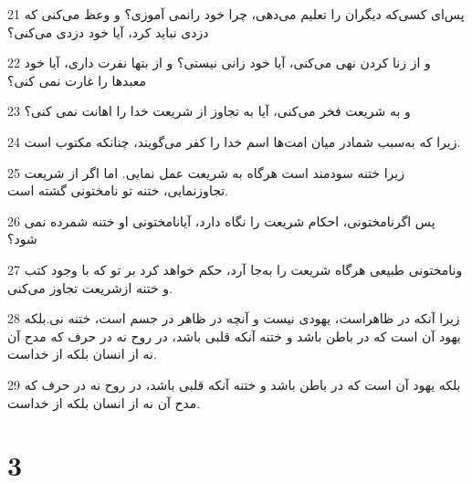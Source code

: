 \par 21 پس‌ای کسی‌که دیگران را تعلیم می‌دهی، چرا خود رانمی آموزی؟ و وعظ می‌کنی که دزدی نباید کرد، آیا خود دزدی می‌کنی؟
\par 22 و از زنا کردن نهی می‌کنی، آیا خود زانی نیستی؟ و از بتها نفرت داری، آیا خود معبدها را غارت نمی کنی؟
\par 23 و به شریعت فخر می‌کنی، آیا به تجاوز از شریعت خدا را اهانت نمی کنی؟
\par 24 زیرا که به‌سبب شمادر میان امت‌ها اسم خدا را کفر می‌گویند، چنانکه مکتوب است.
\par 25 زیرا ختنه سودمند است هرگاه به شریعت عمل نمایی. اما اگر از شریعت تجاوزنمایی، ختنه تو نامختونی گشته است.
\par 26 پس اگرنامختونی، احکام شریعت را نگاه دارد، آیانامختونی او ختنه شمرده نمی شود؟
\par 27 ونامختونی طبیعی هرگاه شریعت را به‌جا آرد، حکم خواهد کرد بر تو که با وجود کتب و ختنه ازشریعت تجاوز می‌کنی.
\par 28 زیرا آنکه در ظاهراست، یهودی نیست و آنچه در ظاهر در جسم است، ختنه نی.بلکه یهود آن است که در باطن باشد و ختنه آنکه قلبی باشد، در روح نه در حرف که مدح آن نه از انسان بلکه از خداست.
\par 29 بلکه یهود آن است که در باطن باشد و ختنه آنکه قلبی باشد، در روح نه در حرف که مدح آن نه از انسان بلکه از خداست.

\chapter{3}


